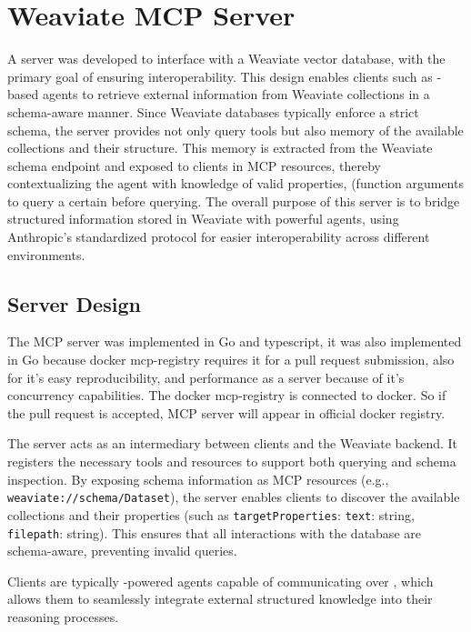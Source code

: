 \section{Weaviate MCP Server}

A  \cite{mcp-architecture} server was developed to interface with a Weaviate vector database, with the primary goal of ensuring interoperability. This design enables clients such as -based agents to retrieve external information from Weaviate collections in a schema-aware manner. Since Weaviate databases typically enforce a strict schema, the server provides not only query tools but also memory of the available collections and their structure. This memory is extracted from the Weaviate schema endpoint and exposed to clients in
MCP resources, thereby contextualizing the agent with knowledge of valid properties, (function arguments to query a certain  before querying.  
The overall purpose of this server is to bridge structured information stored in Weaviate with powerful  agents, using Anthropic’s standardized protocol for easier interoperability across different environments.

\subsection{Server Design}

The MCP server was implemented in Go and typescript, it was also implemented in Go because docker mcp-registry requires it for a pull request submission, also for it's easy reproducibility, and performance as a server because of it's concurrency capabilities. The docker mcp-registry is connected to docker. So if the pull request is accepted, MCP server will appear in official docker registry.

The server acts as an intermediary between clients and the Weaviate backend. It registers the necessary tools and resources to support both querying and schema inspection. By exposing schema information as MCP resources (e.g., \texttt{weaviate://schema/Dataset}), the server enables clients to discover the available collections and their properties (such as \texttt{targetProperties}: {\texttt{text}: string, \texttt{filepath}: string}). This ensures that all interactions with the database are schema-aware, preventing invalid queries.  

Clients are typically -powered agents capable of communicating over , which allows them to seamlessly integrate external structured knowledge into their reasoning processes.

